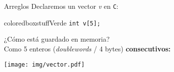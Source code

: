 \documentclass[aspectratio=169]{beamer}
\begin{document}
\begin{frame}[fragile]{Arreglos}
    Declaremos un vector \textit{v} en \texttt{C}:\\
    \bigskip
    \pause
    \begin{beamercolorbox}[wd=0.9\textwidth,sep=0.5em]{coloredboxstuffVerde}
    \verb|int v[5];|
    \end{beamercolorbox}
    \bigskip
    ¿Cómo está guardado en memoria?\\
    \bigskip
    \pause
    Como 5 enteros (\textit{doublewords} / 4 bytes) \textbf{consecutivos:}\\
    \bigskip
    \begin{center}
    \texttt{[image: img/vector.pdf]}
    \end{center}
\end{frame}

%     
\end{document}
